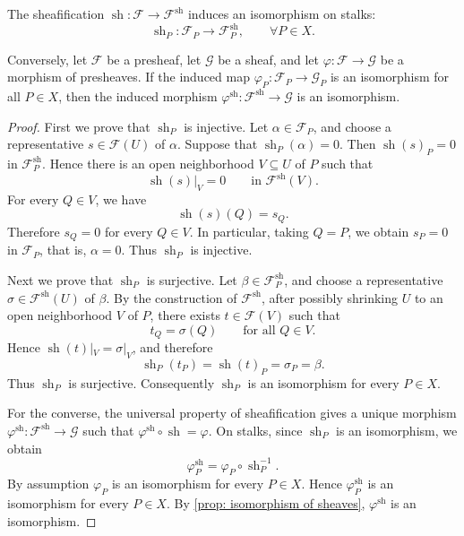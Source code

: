 \documentclass[11pt]{article}
\newcommand{\sh}{\operatorname{sh}}
\begin{document}
\begin{lemma}
    \label{lemma: sheafification on stalks}
    \cite[2.4 M]{vakilTheRisingSea}
    The sheafification
    \(\sh:\mathscr{F}\to\mathscr{F}^{\sh}\)
    induces an isomorphism on stalks:
    \[
        \sh_{P}:\mathscr{F}_{P}
        \longrightarrow
        \mathscr{F}^{\sh}_{P},
        \qquad
        \forall P \in X.
    \]

    Conversely, let \(\mathscr{F}\) be a presheaf,
    let \(\mathscr{G}\) be a sheaf, and let
    \(\varphi:\mathscr{F}\to\mathscr{G}\) be a morphism of
    presheaves. If the induced map
    \(\varphi_{P}:\mathscr{F}_{P}\to\mathscr{G}_{P}\)
    is an isomorphism for all \(P \in X\), then the induced
    morphism
    \(\varphi^{\sh}:\mathscr{F}^{\sh}\to\mathscr{G}\)
    is an isomorphism.
\end{lemma}

\begin{proof}
    First we prove that \(\sh_{P}\) is injective.
    Let \(\alpha \in \mathscr{F}_{P}\), and choose a
    representative \(s \in \mathscr{F}(U)\) of \(\alpha\).
    Suppose that \(\sh_{P}(\alpha)=0\).
    Then \(\sh(s)_{P}=0\) in \(\mathscr{F}^{\sh}_{P}\).
    Hence there is an open neighborhood \(V \subseteq U\) of \(P\)
    such that
    \[
        \sh(s)|_{V} = 0
        \qquad
        \text{in } \mathscr{F}^{\sh}(V).
    \]
    For every \(Q \in V\), we have
    \[
        \sh(s)(Q) = s_{Q}.
    \]
    Therefore \(s_{Q}=0\) for every \(Q \in V\).
    In particular, taking \(Q=P\), we obtain \(s_{P}=0\) in
    \(\mathscr{F}_{P}\), that is, \(\alpha=0\).
    Thus \(\sh_{P}\) is injective.

    Next we prove that \(\sh_{P}\) is surjective.
    Let \(\beta \in \mathscr{F}^{\sh}_{P}\), and choose a
    representative
    \(\sigma \in \mathscr{F}^{\sh}(U)\) of \(\beta\).
    By the construction of \(\mathscr{F}^{\sh}\), after possibly
    shrinking \(U\) to an open neighborhood \(V\) of \(P\), there
    exists \(t \in \mathscr{F}(V)\) such that
    \[
        t_{Q} = \sigma(Q)
        \qquad
        \text{for all } Q \in V.
    \]
    Hence \(\sh(t)|_{V} = \sigma|_{V}\), and therefore
    \[
        \sh_{P}(t_{P})
        =
        \sh(t)_{P}
        =
        \sigma_{P}
        =
        \beta.
    \]
    Thus \(\sh_{P}\) is surjective.
    Consequently \(\sh_{P}\) is an isomorphism for every
    \(P \in X\).

    For the converse, the universal property of sheafification
    gives a unique morphism
    \(\varphi^{\sh}:\mathscr{F}^{\sh}\to\mathscr{G}\)
    such that
    \(\varphi^{\sh}\circ\sh = \varphi\).
    On stalks, since \(\sh_{P}\) is an isomorphism, we obtain
    \[
        \varphi^{\sh}_{P}
        =
        \varphi_{P}\circ\sh_{P}^{-1}.
    \]
    By assumption \(\varphi_{P}\) is an isomorphism for every
    \(P \in X\). Hence \(\varphi^{\sh}_{P}\) is an isomorphism
    for every \(P \in X\).
    By \autoref{prop: isomorphism of sheaves},
    \(\varphi^{\sh}\) is an isomorphism.
\end{proof}
\end{document}

